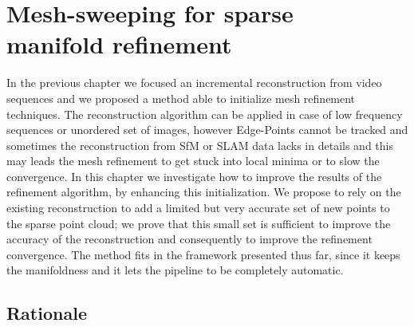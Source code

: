 \chapter[Mesh-sweeping for sparse manifold refinement]{Mesh-sweeping for sparse \\manifold refinement}
\label{ch:sweeping}

% 
In the previous chapter we focused an incremental reconstruction from video sequences and we proposed a method able to initialize mesh refinement techniques. 
The reconstruction algorithm can be applied in case of low frequency sequences or unordered set of images, however Edge-Points cannot be tracked and sometimes the reconstruction from SfM or SLAM data lacks in details and this may leads the mesh refinement to get stuck into local minima or to slow the convergence.
In this chapter we investigate how to improve the results of the refinement algorithm, by enhancing this initialization. 
We propose to rely on the existing reconstruction to add a limited but very accurate set of new points to the sparse point cloud; we prove that this small set is sufficient to improve the accuracy of the reconstruction and consequently to improve the refinement convergence. 
The method fits in the framework presented thus far, since it keeps the manifoldness and it lets the pipeline to be completely automatic.

\minitoc
\newpage

\section{Rationale}


